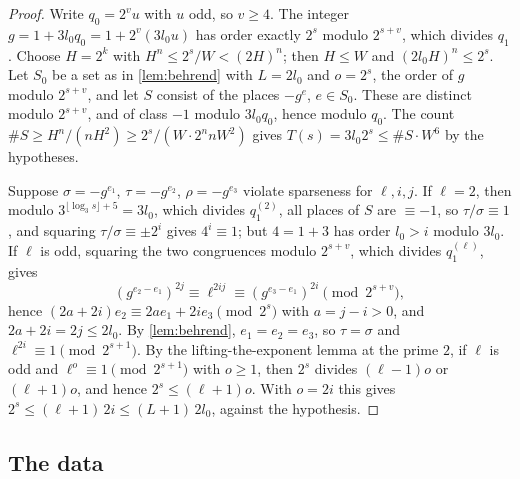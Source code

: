 \begin{proof}
Write $q_0=2^vu$ with $u$ odd, so $v\ge4$. The integer $g=1+3l_0q_0=1+2^v(3l_0u)$ has order exactly
$2^s$ modulo $2^{s+v}$, which divides $q_1$. Choose $H=2^k$ with $H^n\le2^s/W<(2H)^n$; then $H\le W$
and $(2l_0H)^n\le2^s$. Let $S_0$ be a set as in \cref{lem:behrend} with $L=2l_0$ and $o=2^s$, the order
of $g$ modulo $2^{s+v}$, and let $S$ consist of the places $-g^e$, $e\in S_0$. These are distinct
modulo $2^{s+v}$, and of class $-1$ modulo $3l_0q_0$, hence modulo $q_0$. The count
$\#S\ge H^n/(nH^2)\ge2^s/(W\cdot2^nnW^2)$ gives $T(s)=3l_0 2^s\le\#S\cdot W^6$ by the hypotheses.

Suppose $\sigma=-g^{e_1}$, $\tau=-g^{e_2}$, $\rho=-g^{e_3}$ violate sparseness for $\ell,i,j$. If
$\ell=2$, then modulo $3^{\lfloor\log_3s\rfloor+5}=3l_0$, which divides $q_1^{(2)}$, all places of $S$
are $\equiv-1$, so $\tau/\sigma\equiv1$, and squaring $\tau/\sigma\equiv\pm2^i$ gives $4^i\equiv1$;
but $4=1+3$ has order $l_0>i$ modulo $3l_0$. If $\ell$ is odd, squaring the two congruences modulo
$2^{s+v}$, which divides $q_1^{(\ell)}$, gives
\[
  (g^{e_2-e_1})^{2j}\equiv\ell^{2ij}\equiv(g^{e_3-e_1})^{2i}\pmod{2^{s+v}},
\]
hence $(2a+2i)e_2\equiv2ae_1+2ie_3\pmod{2^s}$ with $a=j-i>0$, and $2a+2i=2j\le2l_0$. By
\cref{lem:behrend}, $e_1=e_2=e_3$, so $\tau=\sigma$ and $\ell^{2i}\equiv1\pmod{2^{s+1}}$. By the
lifting-the-exponent lemma at the prime $2$, if $\ell$ is odd and $\ell^o\equiv1\pmod{2^{s+1}}$ with
$o\ge1$, then $2^s$ divides $(\ell-1)o$ or $(\ell+1)o$, and hence $2^s\le(\ell+1)o$. With $o=2i$ this
gives $2^s\le(\ell+1)\,2i\le(L+1)\,2l_0$, against the hypothesis.
\end{proof}

\subsection{The data}\label{ss:data}

